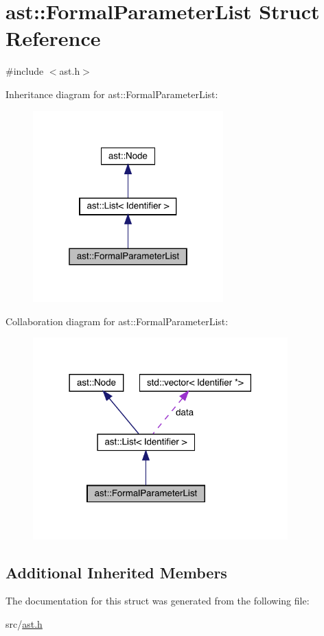 \hypertarget{structast_1_1_formal_parameter_list}{}\section{ast\+:\+:Formal\+Parameter\+List Struct Reference}
\label{structast_1_1_formal_parameter_list}


{\ttfamily \#include $<$ast.\+h$>$}



Inheritance diagram for ast\+:\+:Formal\+Parameter\+List\+:
\nopagebreak
\begin{figure}[H]
\begin{center}
\leavevmode
\includegraphics[width=208pt]{structast_1_1_formal_parameter_list__inherit__graph}
\end{center}
\end{figure}


Collaboration diagram for ast\+:\+:Formal\+Parameter\+List\+:
\nopagebreak
\begin{figure}[H]
\begin{center}
\leavevmode
\includegraphics[width=278pt]{structast_1_1_formal_parameter_list__coll__graph}
\end{center}
\end{figure}
\subsection*{Additional Inherited Members}


The documentation for this struct was generated from the following file\+:\begin{DoxyCompactItemize}
\item 
src/\hyperlink{ast_8h}{ast.\+h}\end{DoxyCompactItemize}
